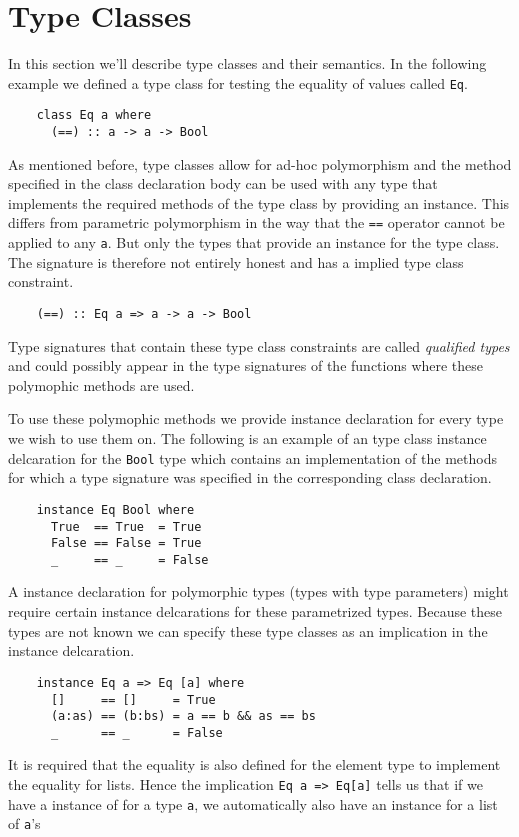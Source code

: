 \section{Type Classes}
In this section we'll describe type classes and their semantics. In the
following example we defined a type class for testing the equality of values
called \texttt{Eq}.

\begin{verbatim}
    class Eq a where
      (==) :: a -> a -> Bool
\end{verbatim}

As mentioned before, type classes allow for ad-hoc polymorphism and the method
specified in the class declaration body can be used with any type that
implements the required methods of the type class by providing an instance.
This differs from parametric polymorphism in the way that the \texttt{==}
operator cannot be applied to any \texttt{a}. But only the types that provide an
instance for the type class. The signature is therefore not entirely honest and
has a implied type class constraint.
\begin{verbatim}
    (==) :: Eq a => a -> a -> Bool
\end{verbatim}
Type signatures that contain these type class constraints are called
\textit{qualified types} and could possibly appear in the type signatures of the
functions where these polymophic methods are used.

To use these polymophic methods we provide instance declaration for every type
we wish to use them on. The following is an example of an type class instance
delcaration for the \texttt{Bool} type which contains an implementation of the
methods for which a type signature was specified in the corresponding class
declaration.
\begin{verbatim}
    instance Eq Bool where
      True  == True  = True
      False == False = True
      _     == _     = False
\end{verbatim}

A instance declaration for polymorphic types (types with type parameters) might
require certain instance delcarations for these parametrized types. Because
these types are not known we can specify these type classes as an implication in
the instance delcaration.
\begin{verbatim}
    instance Eq a => Eq [a] where
      []     == []     = True
      (a:as) == (b:bs) = a == b && as == bs
      _      == _      = False
\end{verbatim}
It is required that the equality is also defined for the element type to
implement the equality for lists. Hence the implication \texttt{Eq a => Eq[a]}
tells us that if we have a instance of \textttEq{} for a type \texttt{a}, we
automatically also have an instance for a list of \texttt{a}'s

